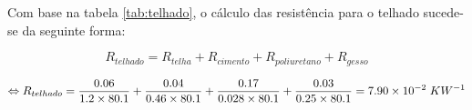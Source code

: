 \documentclass[12pt, a4paper]{article}
\begin{document}
Com base na tabela \ref*{tab:telhado}, o cálculo das resistência para o telhado sucede-se da seguinte forma:

\begin{equation}
	R_{telhado} = R_{telha} + R_{cimento} + R_{poliuretano} + R_{gesso}
	\label{eq:telhado1}
\end{equation}

\begin{equation}
	\Leftrightarrow R_{telhado} =
	\dfrac{0.06}{1.2 \times 80.1} +
	\dfrac{0.04}{0.46 \times 80.1} +
	\dfrac{0.17}{0.028 \times 80.1} +
	\dfrac{0.03}{0.25 \times 80.1} = 7.90 \times 10^{-2} \hspace{1mm} KW^{-1}
	\label{eq:telhado2}
\end{equation}




\printbibliography{}
\end{document}
